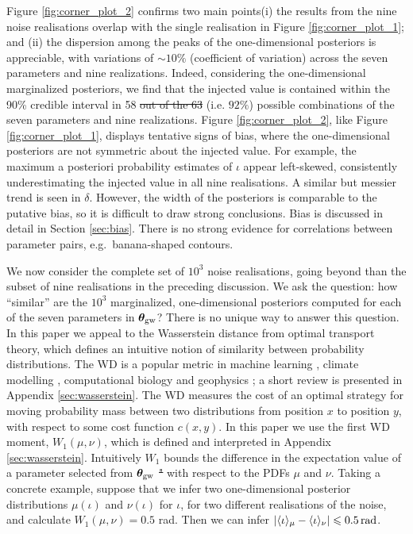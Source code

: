 \documentclass[fleqn,usenatbib,useAMS]{mnras}
\providecommand{\DIFadd}[1]{{\protect\color{blue}\uwave{#1}}} %
\providecommand{\DIFdel}[1]{{\protect\color{red}\sout{#1}}}                      %
\providecommand{\DIFaddbegin}{} %
\providecommand{\DIFaddend}{} %
\providecommand{\DIFdelbegin}{} %
\providecommand{\DIFdelend}{} %
\newcommand{\DIFscaledelfig}{0.5}
\newlength{\DIFdelgraphicswidth} %
\newlength{\DIFdelgraphicsheight} %
\newcommand{\DIFaddincludegraphics}[2][]{{\color{blue}\fbox{\DIFOincludegraphics[#1]{#2}}}} %
\newcommand{\DIFdelincludegraphics}[2][]{%
\sbox{\DIFdelgraphicsbox}{\DIFOincludegraphics[#1]{#2}}%
\settoboxwidth{\DIFdelgraphicswidth}{\DIFdelgraphicsbox} %
\settoboxtotalheight{\DIFdelgraphicsheight}{\DIFdelgraphicsbox} %
\scalebox{\DIFscaledelfig}{%
\parbox[b]{\DIFdelgraphicswidth}{\usebox{\DIFdelgraphicsbox}\\[-\baselineskip] \rule{\DIFdelgraphicswidth}{0em}}\llap{\resizebox{\DIFdelgraphicswidth}{\DIFdelgraphicsheight}{%
\setlength{\unitlength}{\DIFdelgraphicswidth}%
\begin{picture}(1,1)%
\thicklines\linethickness{2pt} %
{\color[rgb]{1,0,0}\put(0,0){\framebox(1,1){}}}%
{\color[rgb]{1,0,0}\put(0,0){\line( 1,1){1}}}%
{\color[rgb]{1,0,0}\put(0,1){\line(1,-1){1}}}%
\end{picture}%
}\hspace*{3pt}}} %
} %
\DeclareRobustCommand{\DIFaddbegin}{\DIFOaddbegin \let\includegraphics\DIFaddincludegraphics} %
\DeclareRobustCommand{\DIFaddend}{\DIFOaddend \let\includegraphics\DIFOincludegraphics} %
\DeclareRobustCommand{\DIFdelbegin}{\DIFOdelbegin \let\includegraphics\DIFdelincludegraphics} %
\DeclareRobustCommand{\DIFdelend}{\DIFOaddend \let\includegraphics\DIFOincludegraphics} %
\begin{document}
Figure \ref{fig:corner_plot_2} confirms two main points\DIFaddbegin \DIFadd{: }\DIFaddend (i) the results from the nine noise realisations overlap with the single realisation in  Figure \ref{fig:corner_plot_1}; and (ii) the dispersion among the peaks of the one-dimensional posteriors is appreciable, with variations of $\sim10 \%$ (coefficient of variation) across the seven parameters and nine realizations. Indeed, considering the one-dimensional marginalized posteriors, we find that the injected value is contained within the 90\% credible interval in 58 \DIFdelbegin \DIFdel{out of the 63 }\DIFdelend (i.e. $92 \%$) \DIFaddbegin \DIFadd{out of the 63 }\DIFaddend possible combinations of the seven parameters and nine realizations. Figure \ref{fig:corner_plot_2}, like Figure \ref{fig:corner_plot_1}, displays tentative signs of bias, where the one-dimensional posteriors are not symmetric about the injected value. For example, the maximum a posteriori probability estimates of $\iota$ appear left-skewed, consistently underestimating the injected value in all nine realisations. A similar but messier trend is seen in $\delta$. However, the width of the posteriors is comparable to the putative bias, so it is difficult to draw strong conclusions. Bias is discussed in detail in Section \ref{sec:bias}. There is no strong evidence for correlations between parameter pairs, e.g.\ banana-shaped contours. \newline 


We now consider the complete set of $10^3$ noise realisations, going beyond than the subset of nine realisations in the preceding discussion. We ask the question: how ``similar'' are the $10^3$ marginalized, one-dimensional posteriors computed for each of the seven parameters in ${\boldsymbol{\theta}}_{\rm gw}$? There is no unique way to answer this question. In this paper we appeal to the Wasserstein distance \citep[WD;][]{Wasserstein,Villani2009} from optimal transport theory, which defines an intuitive notion of similarity between probability distributions. The WD is a popular metric in machine learning \citep{2017arXiv170107875A}, climate modelling \citep{2022JCli...35.1215P,2023QJRMS.149..843K}, computational biology \citep{GONZALEZDELGADO2023168053} and geophysics \citep{2023GeoRL..5003880M}; a short review is presented in Appendix \ref{sec:wasserstein}. The WD measures the cost of an optimal strategy for moving probability mass between two distributions from position $x$ to position $y$, with respect to some cost function $c(x,y)$. In this paper we use the first WD moment, $W_1(\mu,\nu)$, which is defined and interpreted in Appendix \ref{sec:wasserstein}. Intuitively $W_1$ bounds the difference in the expectation value of a parameter selected from ${\boldsymbol{\theta}}_{\rm gw}$ \DIFdelbegin \DIFdel{" }\DIFdelend with respect to the PDFs $\mu$ and $\nu$. Taking a concrete example, suppose that we infer two one-dimensional posterior distributions $\mu(\iota)$ and $\nu(\iota)$ for $\iota$, for two different realisations of the noise, and calculate $W_1(\mu, \nu) =0.5$ rad. Then we can infer $| \langle \iota \rangle_\mu - \langle \iota \rangle_\nu | \leq 0.5 \, {\rm rad}$. \newline 
\end{document}
